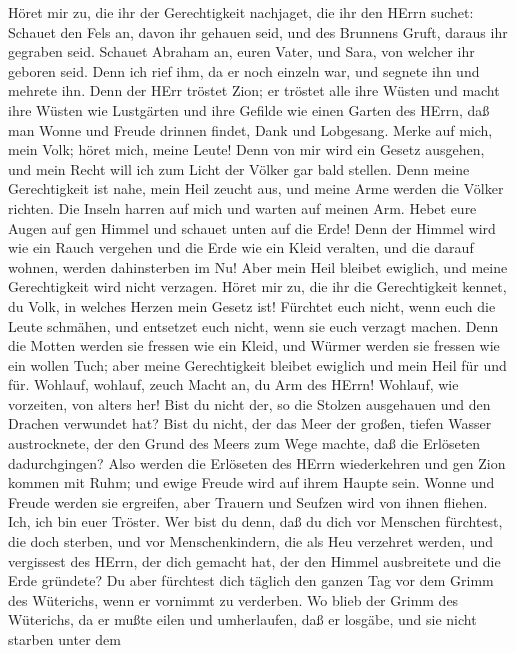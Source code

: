  Höret mir zu, die ihr der Gerechtigkeit nachjaget, die ihr
den HErrn suchet: Schauet den Fels an, davon ihr gehauen seid, und des
Brunnens Gruft, daraus ihr gegraben seid.  Schauet Abraham
an, euren Vater, und Sara, von welcher ihr geboren seid. Denn ich rief
ihm, da er noch einzeln war, und segnete ihn und mehrete ihn.
 Denn der HErr tröstet Zion; er tröstet alle ihre Wüsten und
macht ihre Wüsten wie Lustgärten und ihre Gefilde wie einen Garten des
HErrn, daß man Wonne und Freude drinnen findet, Dank und Lobgesang.
 Merke auf mich, mein Volk; höret mich, meine Leute! Denn
von mir wird ein Gesetz ausgehen, und mein Recht will ich zum Licht der
Völker gar bald stellen.  Denn meine Gerechtigkeit ist nahe,
mein Heil zeucht aus, und meine Arme werden die Völker richten. Die
Inseln harren auf mich und warten auf meinen Arm.  Hebet
eure Augen auf gen Himmel und schauet unten auf die Erde! Denn der
Himmel wird wie ein Rauch vergehen und die Erde wie ein Kleid veralten,
und die darauf wohnen, werden dahinsterben im Nu! Aber mein Heil bleibet
ewiglich, und meine Gerechtigkeit wird nicht verzagen. 
Höret mir zu, die ihr die Gerechtigkeit kennet, du Volk, in welches
Herzen mein Gesetz ist! Fürchtet euch nicht, wenn euch die Leute
schmähen, und entsetzet euch nicht, wenn sie euch verzagt machen.
 Denn die Motten werden sie fressen wie ein Kleid, und
Würmer werden sie fressen wie ein wollen Tuch; aber meine Gerechtigkeit
bleibet ewiglich und mein Heil für und für.  Wohlauf,
wohlauf, zeuch Macht an, du Arm des HErrn! Wohlauf, wie vorzeiten, von
alters her! Bist du nicht der, so die Stolzen ausgehauen und den Drachen
verwundet hat?  Bist du nicht, der das Meer der großen,
tiefen Wasser austrocknete, der den Grund des Meers zum Wege machte, daß
die Erlöseten dadurchgingen?  Also werden die Erlöseten des
HErrn wiederkehren und gen Zion kommen mit Ruhm; und ewige Freude wird
auf ihrem Haupte sein. Wonne und Freude werden sie ergreifen, aber
Trauern und Seufzen wird von ihnen fliehen.  Ich, ich bin
euer Tröster. Wer bist du denn, daß du dich vor Menschen fürchtest, die
doch sterben, und vor Menschenkindern, die als Heu verzehret werden,
 und vergissest des HErrn, der dich gemacht hat, der den
Himmel ausbreitete und die Erde gründete? Du aber fürchtest dich täglich
den ganzen Tag vor dem Grimm des Wüterichs, wenn er vornimmt zu
verderben. Wo blieb der Grimm des Wüterichs,  da er mußte
eilen und umherlaufen, daß er losgäbe, und sie nicht starben unter dem
